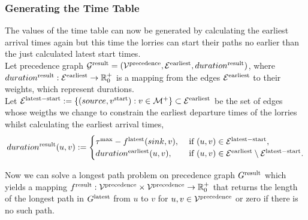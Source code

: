 
\subsubsection{Generating the Time Table}

The values of the time table can now be generated by calculating the earliest arrival times again but this time the lorries can start their paths no earlier than the just calculated latest start times.\\


Let precedence graph 
$\mathcal G^{\rm result} = (\mathcal V^{\rm precedence}, \mathcal E^{\rm earliest} , duration^{\rm result})$, where
$duration^{\rm result}:\mathcal E^{\rm earliest} \rightarrow \mathbb R^+_0$
is a mapping from
the edges  $\mathcal E^{\rm earliest}$ to their weights, which represent durations. \\

Let
$\mathcal E^{\rm latest-start} := \{(source,v^{\rm start}) : v \in \mathcal M^{+ } \} \subset \mathcal E^{\rm earliest}$
be the set of edges 
whose weigths we change to constrain the  earliest departure times of the lorries whilst calculating the earliest arrival times,
\begin{align}
  duration^{\rm result}(u,v) :=
  \begin{cases}
    \tau^{\rm max} - f^{\rm latest}(sink,v)     ,
    & \text{ if }   (u,v) \in \mathcal E^{\rm latest-start},  \\
    duration^{\rm earliest}(u,v)      ,
    & \text{ if }   (u,v) \in \mathcal E^{\rm earliest} \setminus \mathcal E^{\rm latest-start}.
  \end{cases}
\notag
\end{align}



Now we can solve a  longest path problem on precedence graph
$G^{\rm result}$
which yields a mapping
$f^{\rm result}: \mathcal V^{\rm precedence} \times \mathcal V^{\rm precedence} \rightarrow \mathbb{R}^+_0$
that returns the length of the longest path in $G^{\rm latest}$ from $u$ to $v$ for  $u,v \in \mathcal V^{\rm precedence}$ or zero if there is no such path.\\


